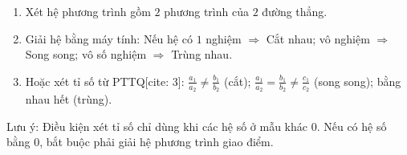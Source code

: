 \begin{enumerate}
\item Xét hệ phương trình gồm $2$ phương trình của $2$ đường thẳng.
\item Giải hệ bằng máy tính: Nếu hệ có $1$ nghiệm $\Rightarrow$ Cắt nhau; vô nghiệm $\Rightarrow$ Song song; vô số nghiệm $\Rightarrow$ Trùng nhau.
\item Hoặc xét tỉ số từ PTTQ[cite: 3]: $\frac{a_1}{a_2} \neq \frac{b_1}{b_2}$ (cắt); $\frac{a_1}{a_2} = \frac{b_1}{b_2} \neq \frac{c_1}{c_2}$ (song song); bằng nhau hết (trùng).
\end{enumerate}
Lưu ý: Điều kiện xét tỉ số chỉ dùng khi các hệ số ở mẫu khác $0$. Nếu có hệ số bằng $0$, bắt buộc phải giải hệ phương trình giao điểm.
